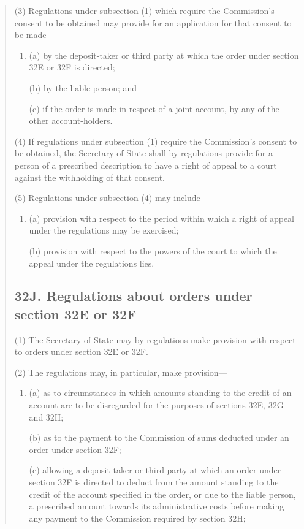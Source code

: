 \documentclass[a4paper]{article}
\begin{document}
\begin{quotation}
(3) Regulations under subsection (1) which require the Commission’s consent
to be obtained may provide for an application for that consent to be made---
\begin{enumerate}\item[]
(a) by the deposit-taker or third party at which the order under section 32E or
32F is directed;

(b) by the liable person; and

(c) if the order is made in respect of a joint account, by any of the other account-holders.
\end{enumerate}

(4) If regulations under subsection (1) require the Commission’s consent to
be obtained, the Secretary of State shall by regulations provide for a person of a
prescribed description to have a right of appeal to a court against the withholding of
that consent.

(5) Regulations under subsection (4) may include---
\begin{enumerate}\item[]
(a) provision with respect to the period within which a right of appeal under the
regulations may be exercised;

(b) provision with respect to the powers of the court to which the appeal under
the regulations lies.
\end{enumerate}

\subsection*{32J. Regulations about orders under section 32E or 32F}

(1) The Secretary of State may by regulations make provision with respect to orders under section 32E or 32F.

(2) The regulations may, in particular, make provision---
\begin{enumerate}\item[]
(a) as to circumstances in which amounts standing to the credit of an account are to be disregarded for the purposes of sections 32E, 32G and 32H;

(b) as to the payment to the Commission of sums deducted under an order under section 32F;

(c) allowing a deposit-taker or third party at which an order under section 32F is directed to deduct from the amount standing to the credit of the account specified in the order, or due to the liable person, a prescribed amount towards its administrative costs before making any payment to the Commission required by section 32H;


\end{enumerate}
\end{quotation}
\end{document}
